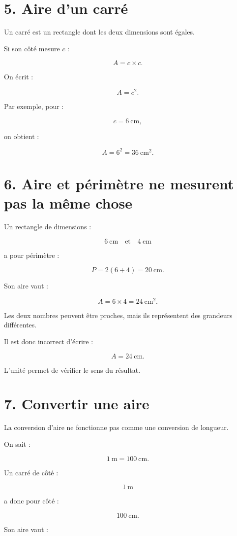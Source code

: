 \section{5. Aire d’un carré}

Un carré est un rectangle dont les deux dimensions sont égales.

Si son côté mesure $c$ :

\[
A=c\times c.
\]

On écrit :

\[
\boxed{A=c^2}.
\]

Par exemple, pour :

\[
c=6\ \text{cm},
\]

on obtient :

\[
A=6^2=36\ \text{cm}^2.
\]

\section{6. Aire et périmètre ne mesurent pas la même chose}

Un rectangle de dimensions :

\[
6\ \text{cm}
\quad\text{et}\quad
4\ \text{cm}
\]

a pour périmètre :

\[
P=2(6+4)=20\ \text{cm}.
\]

Son aire vaut :

\[
A=6\times4=24\ \text{cm}^2.
\]

Les deux nombres peuvent être proches, mais ils représentent des grandeurs différentes.

Il est donc incorrect d’écrire :

\[
A=24\ \text{cm}.
\]

L’unité permet de vérifier le sens du résultat.

\section{7. Convertir une aire}

La conversion d’aire ne fonctionne pas comme une conversion de longueur.

On sait :

\[
1\ \text{m}=100\ \text{cm}.
\]

Un carré de côté :

\[
1\ \text{m}
\]

a donc pour côté :

\[
100\ \text{cm}.
\]

Son aire vaut :

